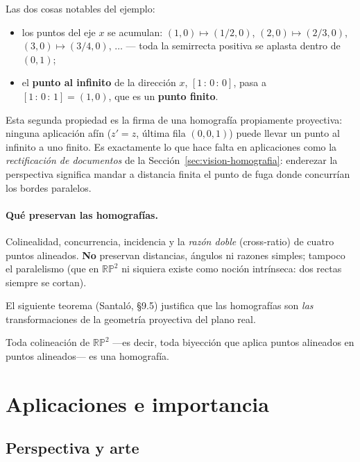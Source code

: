 \documentclass[11pt,a4paper]{article}
\newcommand{\RP}{\mathbb{RP}}
\newcommand{\hp}[3]{[#1\,{:}\,#2\,{:}\,#3]}
\begin{document}
\noindent Las dos cosas notables del ejemplo:
\begin{itemize}[leftmargin=1.4em,itemsep=2pt]
\item los puntos del eje $x$ se acumulan: $(1,0)\mapsto(1/2,0)$,
  $(2,0)\mapsto(2/3,0)$, $(3,0)\mapsto(3/4,0)$, $\ldots$ — toda la
  semirrecta positiva se aplasta dentro de $(0,1)$;
\item el \textbf{punto al infinito} de la dirección $x$, $\hp{1}{0}{0}$,
  pasa a $\hp{1}{0}{1}=(1,0)$, que es un \textbf{punto finito}.
\end{itemize}
Esta segunda propiedad es la firma de una homografía propiamente
proyectiva: ninguna aplicación afín ($z'=z$, última fila $(0,0,1)$)
puede llevar un punto al infinito a uno finito. Es exactamente lo que
hace falta en aplicaciones como la \emph{rectificación de documentos}
de la Sección~\ref{sec:vision-homografia}: enderezar la perspectiva
significa mandar a distancia finita el punto de fuga donde concurrían
los bordes paralelos.

\paragraph{Qué preservan las homografías.}
Colinealidad, concurrencia, incidencia y la \emph{razón doble}
(cross-ratio) de cuatro puntos alineados. \textbf{No} preservan
distancias, ángulos ni razones simples; tampoco el paralelismo (que en
$\RP^2$ ni siquiera existe como noción intrínseca: dos rectas siempre
se cortan).

El siguiente teorema (Santaló, §9.5) justifica que las homografías son
\emph{las} transformaciones de la geometría proyectiva del plano real.

\begin{teorema}
Toda colineación de $\RP^2$ —es decir, toda biyección que aplica puntos
alineados en puntos alineados— es una homografía.
\end{teorema}

\section{Aplicaciones e importancia}

\subsection{Perspectiva y arte}
\end{document}
